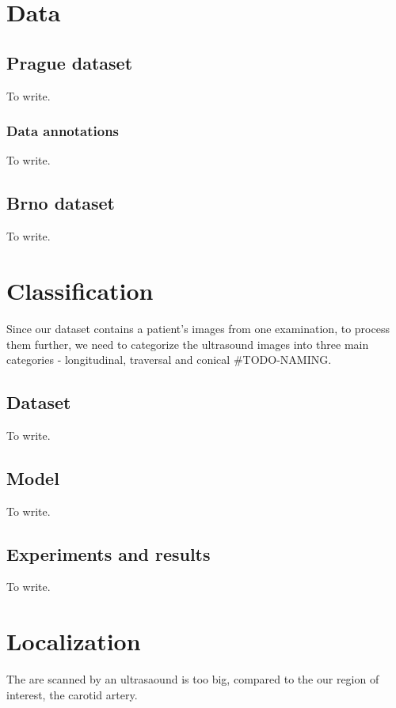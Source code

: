


\chapter{Data}
\section{Prague dataset}
To write.

\subsection{Data annotations}
To write.


\section{Brno dataset}
To write.



\chapter{Classification}
Since our dataset contains a patient's images from one examination, to process
them further, we need to categorize the ultrasound images into three main 
categories - longitudinal, traversal and conical #TODO-NAMING.

\section{Dataset}
To write.

\section{Model}
To write.

\section{Experiments and results}
To write.



\chapter{Localization}
The are scanned by an ultrasaound is too big, compared to the our region of interest, 
the carotid artery.


